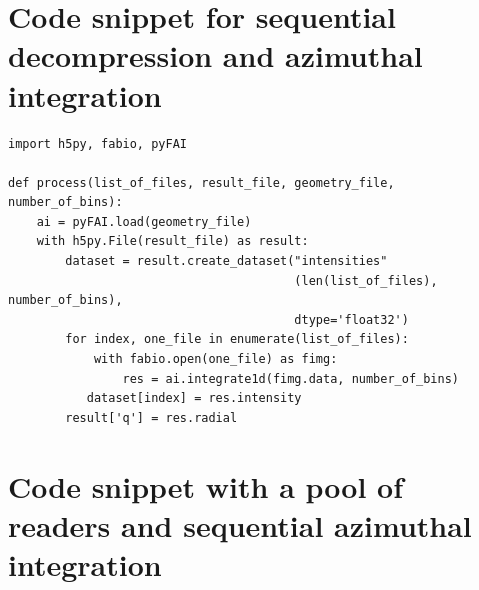 \documentclass[preprint]{iucr}              %
\begin{document}
\appendix
\section{Code snippet for sequential decompression and azimuthal integration}

\begin{minipage}{\linewidth}
\label{sequentialsnippet}
\begin{verbatim}
import h5py, fabio, pyFAI

def process(list_of_files, result_file, geometry_file, number_of_bins):
    ai = pyFAI.load(geometry_file)
    with h5py.File(result_file) as result:
        dataset = result.create_dataset("intensities"
                                        (len(list_of_files), number_of_bins),
                                        dtype='float32')
        for index, one_file in enumerate(list_of_files):
            with fabio.open(one_file) as fimg:
                res = ai.integrate1d(fimg.data, number_of_bins)
           dataset[index] = res.intensity
        result['q'] = res.radial
\end{verbatim}
\end{minipage}

\goodbreak

\section{Code snippet with a pool of readers and sequential azimuthal
integration}
\end{document}
